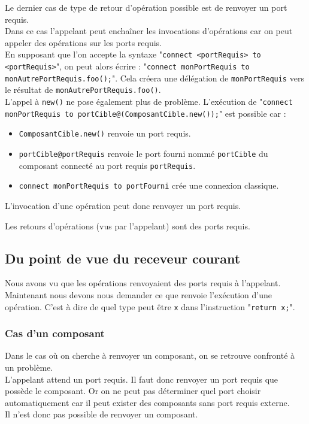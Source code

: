 \documentclass[11pt,a4paper,openany,oneside]{book}
\begin{document}
\label{returnrequisnew}

Le dernier cas de type de retour d'opération possible est de renvoyer un port requis.\\
Dans ce cas l'appelant peut enchaîner les invocations d'opérations car on peut appeler des opérations sur les ports requis.\\
En supposant que l'on accepte la syntaxe "\texttt{connect <portRequis> to <portRequis>}", on peut alors écrire : "\texttt{connect monPortRequis to monAutrePortRequis.foo();}". Cela créera une délégation de \texttt{monPortRequis} vers le résultat de  \texttt{monAutrePortRequis.foo()}.\\
L'appel à \texttt{new()} ne pose également plus de problème. L'exécution de "\texttt{connect monPortRequis to portCible@(ComposantCible.new());}" est possible car : 
\begin{itemize}
\item \texttt{ComposantCible.new()} renvoie un port requis.
\item \texttt{portCible@portRequis} renvoie le port fourni nommé \texttt{portCible} du composant connecté au port requis \texttt{portRequis}.
\item \texttt{connect monPortRequis to portFourni} crée une connexion classique.
\end{itemize}
L'invocation d'une opération peut donc renvoyer un port requis.

Les retours d'opérations (vus par l'appelant) sont des ports requis.



\subsection{Du point de vue du receveur courant}
Nous avons vu que les opérations renvoyaient des ports requis à l'appelant. Maintenant nous devons nous demander ce que renvoie l'exécution d'une opération. C'est à dire de quel type peut être \texttt{x} dans l'instruction "\texttt{return x;}".

\subsubsection{Cas d'un composant}
Dans le cas où on cherche à renvoyer un composant, on se retrouve confronté à un problème.\\
L'appelant attend un port requis. Il faut donc renvoyer un port requis que possède le composant. Or on ne peut pas déterminer quel port choisir automatiquement car il peut exister des composants sans port requis externe.\\
Il n'est donc pas possible de renvoyer un composant.
\end{document}
